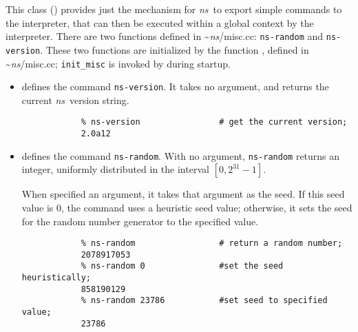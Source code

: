 This class ()
provides just the mechanism for \emph{ns}\ to export
simple commands to the interpreter, 
that can then be executed within a global context by the interpreter.
There are two functions defined in \textasciitilde\emph{ns}/{misc.cc}:
{\tt ns-random} and {\tt ns-version}.
These two functions are initialized by the function
,
defined in \textasciitilde\emph{ns}/{misc.cc};
{\tt init\_misc} is invoked by
during startup.
\begin{itemize}\itemsep0pt
\item {}
  defines the command {\tt ns-version}.
  It takes no argument, and returns the current \emph{ns}\ version string.
\begin{verbatim}
            % ns-version                # get the current version;
            2.0a12
\end{verbatim}

\item {}
  defines the command {\tt ns-random}.
  With no argument, {\tt ns-random} returns an integer,
  uniformly distributed in the interval $[0, 2^{31}-1]$.

  When specified an argument, it takes that argument as the seed.
  If this seed value is 0, the command uses a heuristic seed value;
  otherwise, it sets the seed for the random number generator to the
  specified value.
\begin{verbatim}
            % ns-random                 # return a random number;
            2078917053
            % ns-random 0               #set the seed heuristically;
            858190129
            % ns-random 23786           #set seed to specified value;
            23786
\end{verbatim}
\end{itemize}


